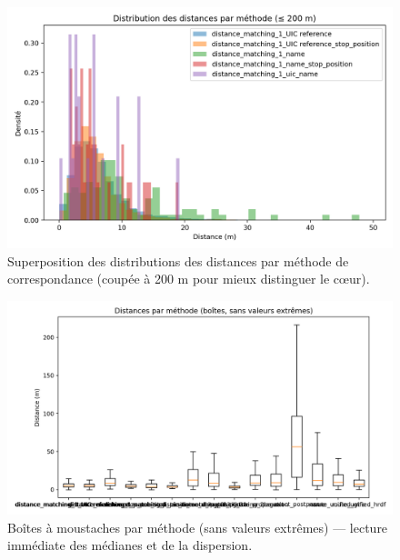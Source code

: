 \begin{figure}[H]
    \centering
    \includegraphics[width=\textwidth]{../figures/chap5/distances_by_method_hist_0_200.png}
    \caption[Distances par méthode ($\leq$ 200 m)]{Superposition des distributions des distances par méthode de correspondance (coupée à 200 m pour mieux distinguer le cœur).}
\end{figure}

\begin{figure}[H]
    \centering
    \includegraphics[width=\textwidth]{../figures/chap5/distances_by_method_box.png}
    \caption[Boîtes par méthode]{Boîtes à moustaches par méthode (sans valeurs extrêmes) — lecture immédiate des médianes et de la dispersion.}
\end{figure}

